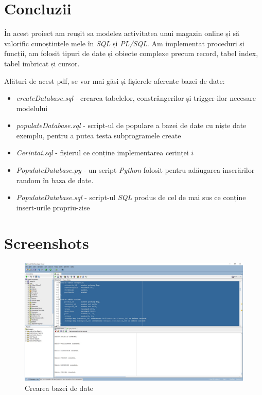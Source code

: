 \documentclass[12pt]{article}
\begin{document}
\pagebreak

\section{Concluzii}
În acest proiect am reușit sa modelez activitatea unui magazin online și să valorific cunoștințele mele în 
\textit{SQL} și \textit{PL/SQL}. Am implementat proceduri și funcții, am folosit tipuri de date și obiecte 
complexe precum record, tabel index, tabel imbricat și cursor.

Alături de acest pdf, se vor mai găsi și fișierele aferente bazei de date:

\begin{itemize}
  \item \textit{createDatabase.sql} - crearea tabelelor, constrângerilor și trigger-ilor necesare modelului
  \item \textit{populateDatabase.sql} - script-ul de populare a bazei de date cu niște date exemplu, pentru
        a putea testa subprogramele create
  \item \textit{Cerintai.sql} - fișierul ce conține implementarea cerinței $i$
  \item \textit{PopulateDatabase.py} - un script \textit{Python} folosit pentru adăugarea inserărilor random
        în baza de date.
  \item \textit{PopulateDatabase.sql} - script-ul \textit{SQL} produs de cel de mai sus ce conține insert-urile propriu-zise
\end{itemize}

\pagebreak

\section{Screenshots}

\begin{figure}[htp]
\centering
\includegraphics[width=1\linewidth]{Creare.jpg}
\caption{Crearea bazei de date}
\end{figure}
\end{document}

